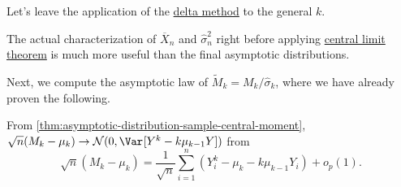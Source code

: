 Let's leave the application of the \hyperref[thm:delta-method]{delta method} to the general \(k\).

\begin{intuition}
	The actual characterization of \(\overline{X} _n\) and \(\hat{\sigma} _n^2\) right before applying \hyperref[thm:CLT]{central limit theorem} is much more useful than the final asymptotic distributions.
\end{intuition}

Next, we compute the asymptotic law of \(\widetilde{M} _k = M_k / \hat{\sigma} _k\), where we have already proven the following.

\begin{prev}
	From \autoref{thm:asymptotic-distribution-sample-central-moment}, \(\sqrt{n} (M_k - \mu _k) \to \mathcal{N} (0, \Var_{}[Y^k - k \mu _{k-1} Y] )\) from
	\[
		\sqrt{n} (M_k - \mu _k)
		= \frac{1}{\sqrt{n} } \sum_{i=1}^{n} (Y_i^k - \mu _k - k \mu _{k-1} Y_i) + o_p(1).
	\]
\end{prev}

